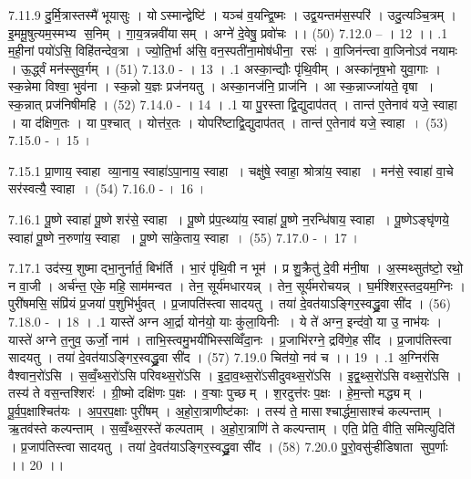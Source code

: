 7.11.9
दु॒र्मि॒त्रास्तस्मै॑ भूयासुः । योऽस्मान्द्वेष्टि॑ । यञ्च॑ व॒यन्द्वि॒ष्मः । उद्व॒यन्तम॑स॒स्परि॑ । उदु॒त्यञ्चि॒त्रम् । इ॒ममू॒षुत्यम॒स्मभ्य स॒निम् । गा॒य॒त्रन्नवी॑यासम् । अग्ने॑ दे॒वेषु॒ प्रवो॑चः ।। (50)
7.12.0
-- । 12 ।।
.1
म॒ही॒नां पयो॑ऽसि॒ विहि॑तन्देव॒त्रा । ज्यो॒ति॒र्भा अ॑सि॒ वन॒स्पती॑ना॒मोष॑धीना॒ रसः॑ । वा॒जिन॑न्त्वा वा॒जिनोऽव॑ नयामः । ऊ॒र्द्ध्वं मन॑स्सुव॒र्गम् । (51)
7.13.0
- । 13 ।
.1
अस्का॒न्द्यौः पृ॑थि॒वीम् । अस्का॑नृष॒भो युवा॒गाः । स्क॒न्नेमा विश्वा॒ भुव॑ना । स्क॒न्नो य॒ज्ञः प्रज॑नयतु । अस्का॒नज॑नि॒ प्राज॑नि । आ स्क॒न्नाज्जा॑यते॒ वृषा । स्क॒न्नात् प्रज॑निषीमहि । (52)
7.14.0
- । 14 ।
.1
या पु॒रस्ताद्वि॒द्युदाप॑तत् । तान्त॑ ए॒तेनाव॑ यजे॒ स्वाहा । या द॑क्षिण॒तः । या प॒श्चात् । योत्त॑र॒तः । योपरि॑ष्टाद्वि॒द्युदाप॑तत् । तान्त॑ ए॒तेनाव॑ यजे॒ स्वाहा । (53)
7.15.0
- । 15 ।
\anuvakamend

7.15.1
प्रा॒णाय॒ स्वाहा व्या॒नाय॒ स्वाहा॑ऽपा॒नाय॒ स्वाहा । चक्षु॑षे॒ स्वाहा॒ श्रोत्रा॑य॒ स्वाहा । मन॑से॒ स्वाहा॑ वा॒चे सर॑स्वत्यै॒ स्वाहा । (54)
7.16.0
- । 16 ।
\anuvakamend


7.16.1
पू॒ष्णे स्वाहा॑ पू॒ष्णे शर॑से॒ स्वाहा । पू॒ष्णे प्र॑प॒त्थ्या॑य॒ स्वाहा॑ पू॒ष्णे न॒रन्धि॑षाय॒ स्वाहा । पू॒ष्णेऽङ्घृ॑णये॒ स्वाहा॑ पू॒ष्णे न॒रुणा॑य॒ स्वाहा । पू॒ष्णे सा॑के॒ताय॒ स्वाहा । (55)
7.17.0
- । 17 ।
\anuvakamend

7.17.1
उद॑स्य॒ शुष्माद्भा॒नुर्नार्त॒ बिभ॑र्ति । भा॒रं पृ॑थि॒वी न भूम॑ । प्र शु॒क्रैतु॑ दे॒वी म॑नी॒षा । अ॒स्मथ्सुत॑ष्टो॒ रथो॒ न वा॒जी । अर्च॑न्त॒ एके॒ महि॒ साम॑मन्वत । तेन॒ सूर्य॑मधारयन्न् । तेन॒ सूर्य॑मरोचयन्न् । घ॒र्मश्शिर॒स्तद॒यम॒ग्निः । पुरी॑षमसि॒ संप्रि॑यं प्र॒जया॑ प॒शुभि॑र्भुवत् । प्र॒जापति॑स्त्वा सादयतु । तया॑ दे॒वत॑याऽङ्गिर॒स्वद्ध्रु॒वा सी॑द । (56)
7.18.0
- । 18 ।
.1
यास्ते॑ अग्न आ॒र्द्रा योन॑यो॒ याः कु॑ला॒यिनीः । ये ते॑ अग्न॒ इन्द॑वो॒ या उ॒ नाभ॑यः । यास्ते॑ अग्ने त॒नुव॒ ऊर्जो॒ नाम॑ । ताभि॒स्त्वमु॒भयी॑भिस्सव्विँदा॒नः । प्र॒जाभि॑रग्ने॒ द्रवि॑णे॒ह सी॑द । प्र॒जाप॑तिस्त्वा सादयतु । तया॑ दे॒वत॑याऽङ्गिर॒स्वद्ध्रु॒वा सी॑द । (57)
7.19.0
चित॑यो॒ नव॑ च ।। 19 ।
.1
अ॒ग्निर॑सि वैश्वान॒रो॑ऽसि । स॒व्वँ॒थ्स॒रो॑ऽसि परिवथ्स॒रो॑ऽसि । इ॒दा॒व॒थ्स॒रो॑ऽसीदुवथ्स॒रो॑ऽसि । इ॒द्व॒थ्स॒रो॑ऽसि वथ्स॒रो॑ऽसि । तस्य॑ ते वस॒न्तश्शिरः॑ । ग्री॒ष्मो दक्षि॑णः प॒क्षः । व॒ऱ्षाः पुच्छम् । श॒रदुत्त॑रः प॒क्षः । हे॒म॒न्तो मद्ध्यम् । पू॒र्व॒प॒क्षाश्चित॑यः । अ॒प॒र॒प॒क्षाः पुरी॑षम् । अ॒हो॒रा॒त्राणीष्ट॑काः । तस्य॑ ते॒ मासाश्चार्द्धमा॒साश्च॑ कल्पन्ताम् । ऋ॒तव॑स्ते कल्पन्ताम् । स॒व्वँ॒थ्स॒रस्ते॑ कल्पताम् । अ॒हो॒रा॒त्राणि॑ ते कल्पन्ताम् । एति॒ प्रेति॒ वीति॒ समित्युदिति॑ । प्र॒जाप॑तिस्त्वा सादयतु । तया॑ दे॒वत॑याऽङ्गिर॒स्वद्ध्रु॒वा सी॑द । (58)
7.20.0
पु॒रो॒वसु॑ऱ्हीडिषाता सुप॒र्णाः ।। 20 ।।
\anuvakamend

